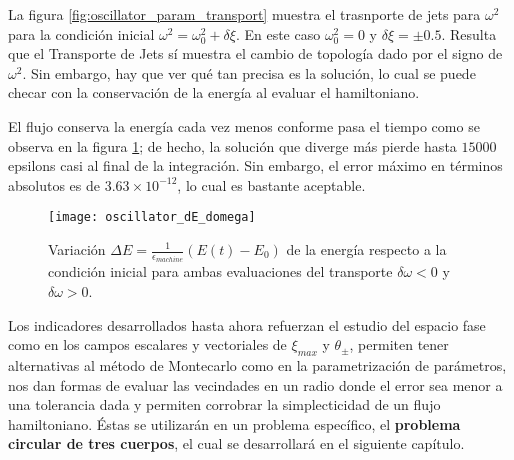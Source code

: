 La figura \ref{fig:oscillator_param_transport} muestra el trasnporte de jets para $\omega^2$ para la condición inicial $\omega^2 = \omega_0^2 + \delta \xi$. En este caso $\omega_0^2 = 0$ y $\delta\xi = \pm 0.5$. Resulta que el Transporte de Jets sí muestra el cambio de topología dado por el signo de $\omega^2$. Sin embargo, hay que ver qué tan precisa es la solución, lo cual se puede checar con la conservación de la energía al evaluar el hamiltoniano. 

El flujo conserva la energía cada vez menos conforme pasa el tiempo como se observa en la figura \ref{fig:oscillator_dE_domega}; de hecho, la solución que diverge más pierde hasta $15000$ epsilons casi al final de la integración. Sin embargo, el error máximo en términos absolutos es de $3.63 \times 10^{-12}$, lo cual es bastante aceptable.

\begin{figure}[h!]
 \centering
 \texttt{[image: oscillator\_dE\_domega]}
 \caption{Variación $\Delta E = \frac{1}{\epsilon_{machine}} \left( E(t) - E_0 \right)$ de la energía respecto a la condición inicial para ambas evaluaciones del transporte $\delta \omega < 0$ y $\delta \omega > 0$.}
 \label{fig:oscillator_dE_domega}
\end{figure}


Los indicadores desarrollados hasta ahora refuerzan el estudio del espacio fase como en los campos escalares y vectoriales de $\xi_{max}$ y $\theta_{\pm}$, permiten tener alternativas al método de Montecarlo como en la parametrización de parámetros, nos dan formas de evaluar las vecindades en un radio donde el error sea menor a una tolerancia dada y permiten corrobrar la simplecticidad de un flujo hamiltoniano. Éstas se utilizarán en un problema específico, el \textbf{problema circular de tres cuerpos}, el cual se desarrollará en el siguiente capítulo.
